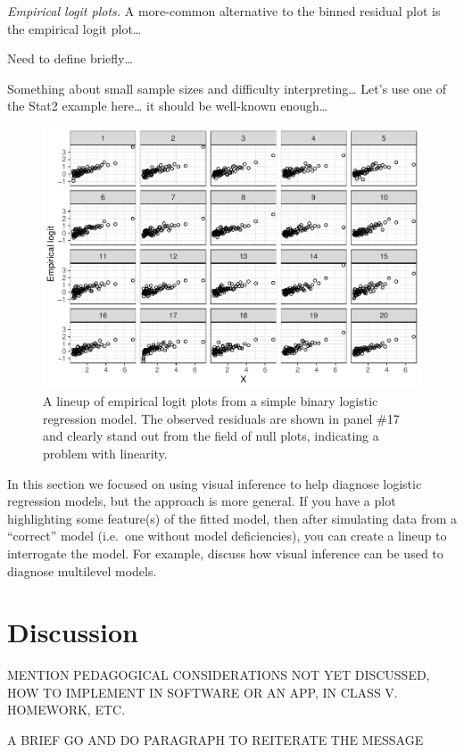 \documentclass[12pt]{article}
\begin{document}
\emph{Empirical logit plots.} A more-common alternative to the binned
residual plot is the empirical logit plot\ldots{}

Need to define briefly\ldots{}

Something about small sample sizes and difficulty interpreting\ldots{}
Let's use one of the Stat2 example here\ldots{} it should be well-known
enough\ldots{}

\begin{figure}
\centering
\includegraphics{figs/emp_logit_lineup.pdf}
\caption{\label{fig:emplogitlineup} A lineup of empirical logit plots
from a simple binary logistic regression model. The observed residuals
are shown in panel \#17 and clearly stand out from the field of null
plots, indicating a problem with linearity.}
\end{figure}

In this section we focused on using visual inference to help diagnose
logistic regression models, but the approach is more general. If you
have a plot highlighting some feature(s) of the fitted model, then after
simulating data from a ``correct'' model (i.e.~one without model
deficiencies), you can create a lineup to interrogate the model. For
example, \cite{Loy2017-fo} discuss how visual inference can be used to
diagnose multilevel models.

\hypertarget{discussion}{%
\section{Discussion}\label{discussion}}

\label{sec:discussion}

MENTION PEDAGOGICAL CONSIDERATIONS NOT YET DISCUSSED, HOW TO IMPLEMENT
IN SOFTWARE OR AN APP, IN CLASS V. HOMEWORK, ETC.

A BRIEF GO AND DO PARAGRAPH TO REITERATE THE MESSAGE



\end{document}
